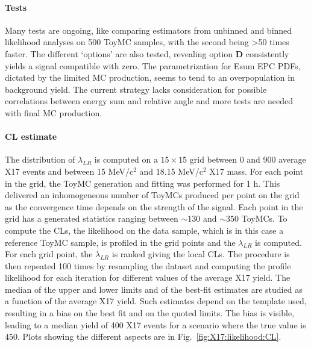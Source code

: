 \begin{refsection}
\paragraph{Tests}
Many tests are ongoing, like comparing estimators from unbinned and binned likelihood analyses on 500 ToyMC samples, with the second being >50 times faster. 
The different `options' are also tested, revealing option \textbf{D} consistently yields a signal compatible with zero. 
The parametrization for Esum EPC PDFs, dictated by the limited MC production, seems to tend to an overpopulation in background yield. 
The current strategy lacks consideration for possible correlations between energy sum and relative angle and more tests are needed with final MC production. 

\paragraph{CL estimate}
The distribution of $\lambda_{LR}$ is computed on a $15 \times 15$ grid between 0 and 900 average X17 events and between 15 MeV/c$^2$ and 18.15 MeV/c$^2$ X17 mass. 
For each point in the grid, the ToyMC generation and fitting was performed for 1 h. 
This delivered an inhomogeneous number of ToyMCs produced per point on the grid as the convergence time depends on the strength of the signal. 
Each point in the grid has a generated statistics ranging between $\sim 130$ and $\sim 350$ ToyMCs. 
To compute the CLs, the likelihood on the data sample, which is in this case a reference ToyMC sample, is profiled in the grid points and the $\lambda_{LR}$ is computed. 
For each grid point, the $\lambda_{LR}$ is ranked giving the local CLs. 
The procedure is then repeated 100 times by resampling the dataset and computing the profile likelihood for each iteration for different values of the average X17 yield. 
The median of the upper and lower limits and of the best-fit estimates are studied as a function of the average X17 yield. 
Such estimates depend on the template used, resulting in a bias on the best fit and on the quoted limits. 
The bias is visible, leading to a median yield of 400 X17 events for a scenario where the true value is 450. 
Plots showing the different aspects are in Fig.~\ref{fig:X17:likelihood:CL}.


\end{refsection}
